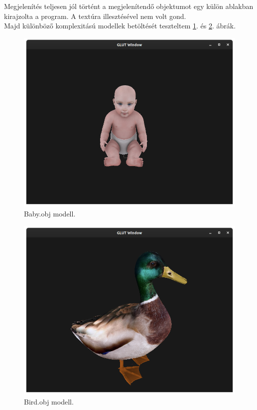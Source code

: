 Megjelenítés teljesen jól történt a megjelenítendő objektumot egy külön ablakban kirajzolta a program. A textúra illesztésével nem volt gond.\\
\newpage
Majd különböző komplexitású modellek betöltését teszteltem \ref{fig:modelbaby}. és  \ref{fig:modelbird}. ábrák.
\bigskip
\begin{figure}[h]
\centering
\includegraphics[scale=0.3]{images/model1.png}
\caption{Baby.obj modell.}
\label{fig:modelbaby}
\end{figure}
\bigskip
\begin{figure}[h]
\centering
\includegraphics[scale=0.3]{images/bird.png}
\caption{Bird.obj modell.}
\label{fig:modelbird}
\end{figure}
\bigskip

